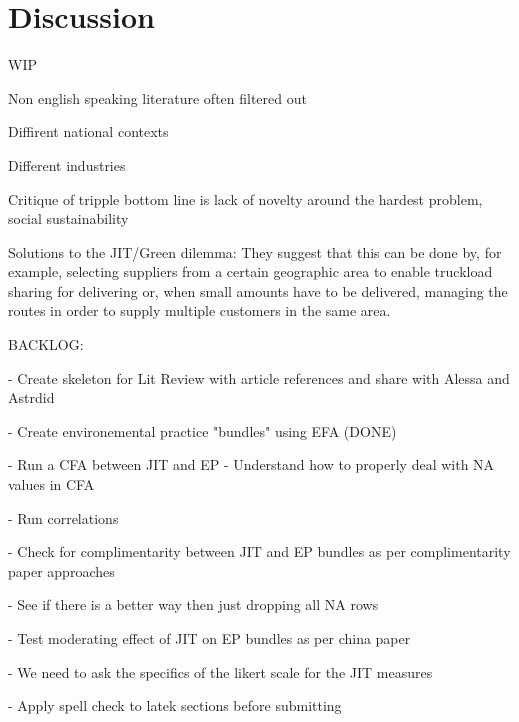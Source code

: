 \section{Discussion}
WIP

Non english speaking literature often filtered out

Diffirent national contexts

Different industries

Critique of tripple bottom line is lack of novelty around the hardest problem, social sustainability

Solutions to the JIT/Green dilemma: They suggest that this can be done by, for example, selecting suppliers from a certain geographic area to enable truckload sharing for delivering or, when small amounts have to be delivered, managing the routes in order to supply multiple customers in the same area. 

BACKLOG:

- Create skeleton for Lit Review with article references and share with Alessa and Astrdid

- Create environemental practice "bundles" using EFA (DONE)

- Run a CFA between JIT and EP
 - Understand how to properly deal with NA values in CFA

- Run correlations

- Check for complimentarity between JIT and EP bundles as per complimentarity paper approaches

- See if there is a better way then just dropping all NA rows

- Test moderating effect of JIT on EP bundles as per china paper

- We need to ask the specifics of the likert scale for the JIT measures

- Apply spell check to latek sections before submitting